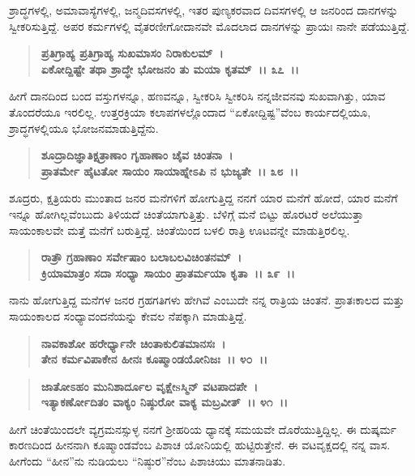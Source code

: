 ಶ್ರಾದ್ಧಗಳಲ್ಲಿ, ಅಮಾವಾಸ್ಯೆಗಳಲ್ಲಿ, ಜನ್ಮದಿವಸಗಳಲ್ಲಿ, ಇತರ ಪುಣ್ಯಕರವಾದ ದಿವಸಗಳಲ್ಲಿ ಆ ಜನರಿಂದ ದಾನಗಳನ್ನು ಸ್ವೀಕರಿಸುತ್ತಿದ್ದೆ. ಅಪರ ಕರ್ಮಗಳಲ್ಲಿ ವೈತರಣೀಗೋದಾನವೇ ಮೊದಲಾದ ದಾನಗಳನ್ನು ಪ್ರಾಯಃ ನಾನೇ ಪಡೆಯುತ್ತಿದ್ದೆ.

\begin{verse}
\textbf{ಪ್ರತಿಗ್ರಾಹ್ಯ ಪ್ರತಿಗ್ರಾಹ್ಯ ಸುಖಮಾಸಂ ನಿರಾಕುಲಮ್~।}\\\textbf{ಏಕೋದ್ದಿಷ್ಟೇ ತಥಾ ಶ್ರಾದ್ಧೇ ಭೋಜನಂ ತು ಮಯಾ ಕೃತಮ್~।। ೩೭~।।}
\end{verse}

ಹೀಗೆ ದಾನದಿಂದ ಬಂದ ವಸ್ತುಗಳನ್ನೂ, ಹಣವನ್ನೂ, ಸ್ವೀಕರಿಸಿ ಸ್ವೀಕರಿಸಿ ನನ್ನ\break ಜೀವನವು ಸುಖವಾಗಿತ್ತು, ಯಾವ ತೊಂದರೆಯೂ ಇರಲಿಲ್ಲ. ಉತ್ತರಕ್ರಿಯಾ ಕಲಾಪಗಳಲ್ಲೊಂದಾದ “ಏಕೋದ್ದಿಷ್ಟ”ವೆಂಬ ಕಾರ್ಯದಲ್ಲಿಯೂ, ಶ್ರಾದ್ಧಗಳಲ್ಲಿಯೂ ಭೋಜನಮಾಡುತ್ತಿದ್ದೆನು.

\begin{verse}
\textbf{ಶೂದ್ರಾದಿಜ್ಞಾತಿಕ್ಷತ್ರಾಣಾಂ ಗೃಹಾಣಾಂ ಚೈವ ಚಿಂತನಾ~।}\\\textbf{ಪ್ರಾತರ್ಮೇ ಹೈಟತೋ ಸಾಯಂ ಸಾಯಾಹ್ನೇಽಪಿ ನ ಭುಜ್ಯತೇ~।। ೩೮~।।}
\end{verse}

ಶೂದ್ರರು, ಕ್ಷತ್ರಿಯರು ಮುಂತಾದ ಜನರ ಮನೆಗಳಿಗೆ ಹೋಗುತ್ತಿದ್ದ ನನಗೆ ಯಾರ ಮನೆಗೆ ಹೋದೆ, ಯಾರ ಮನೆಗೆ ಇನ್ನೂ ಹೋಗಿಲ್ಲವೆಂಬುದು ತಿಳಿಯದೆ ಚಿಂತೆಯಾಗುತ್ತಿತ್ತು. ಬೆಳಿಗ್ಗೆ ಮನೆ ಬಿಟ್ಟು ಹೊರಟರೆ ಅಲೆಯುತ್ತಾ ಸಾಯಂಕಾಲವೇ ಮತ್ತೆ ಮನೆಗೆ ಬರುತ್ತಿದ್ದೆ. ಚಿಂತೆಯಿಂದ ಬಳಲಿ ರಾತ್ರಿ ಊಟವನ್ನೇ ಮಾಡುತ್ತಿರಲಿಲ್ಲ.

\begin{verse}
\textbf{ರಾತ್ರೌ ಗ್ರಹಾಣಾಂ ಸರ್ವೇಷಾಂ ಬಲಾಬಲವಿಚಿಂತನಮ್~।}\\\textbf{ಕ್ರಿಯಾಮಾತ್ರಂ ಸದಾ ಸಂಧ್ಯಾ ಸಾಯಂ ಪ್ರಾತರ್ಮಯಾ ಕೃತಾ~।। ೩೯~।।}
\end{verse}

ನಾನು ಹೋಗುತ್ತಿದ್ದ ಮನೆಗಳ ಜನರ ಗ್ರಹಗತಿಗಳು ಹೇಗಿವೆ ಎಂಬುದೇ ನನ್ನ ರಾತ್ರಿಯ ಚಿಂತನೆ. ಪ್ರಾತಃಕಾಲದ ಮತ್ತು ಸಾಯಂಕಾಲದ ಸಂಧ್ಯಾವಂದನೆಯನ್ನು ಕೇವಲ ನೆಪಕ್ಕಾಗಿ ಮಾಡುತ್ತಿದ್ದೆ.

\begin{verse}
\textbf{ನಾವಕಾಶೋ ಹರೇರ್ಧ್ಯಾನೇ ಚಿಂತಾಕುಲಿತಮಾನಸಃ~।}\\\textbf{ತೇನ ಕರ್ಮವಿಪಾಕೇನ ಹೀನಃ ಕೂಷ್ಮಾಂಡಯೋನಿಜಃ~।। ೪೦~।। }
\end{verse}

\begin{verse}
\textbf{ಜಾತೋಽಹಂ ಮುನಿಶಾರ್ದೂಲ ವೃಕ್ಷೇsಸ್ಮಿನ್ ವಟಪಾದಪೇ~।}\\\textbf{ಇತ್ಯಾಕರ್ಣೋದಿತಂ ವಾಕ್ಯಂ ನಿಷ್ಠುರೋ ವಾಕ್ಯ ಮಬ್ರವೀತ್~।। ೪೧~।।}
\end{verse}

ಹೀಗೆ ಚಿಂತೆಯಿಂದಲೇ ವ್ಯಗ್ರಮನಸ್ಸುಳ್ಳ ನನಗೆ ಶ‍್ರೀಹರಿಯ ಧ್ಯಾನಕ್ಕೆ ಸಮಯವೇ ದೊರೆಯುತ್ತಿದ್ದಿಲ್ಲ. ಈ ದುಷ್ಕರ್ಮ ಕಾರಣದಿಂದ ಹೀನನಾಗಿ ಕೂಷ್ಮಾಂಡವೆಂಬ ಪಿಶಾಚ ಯೋನಿಯಲ್ಲಿ ಹುಟ್ಟಿರುತ್ತೇನೆ. ಈ ವಟವೃಕ್ಷದಲ್ಲಿ ನನ್ನ ವಾಸ. ಹೀಗೆಂದು “ಹೀನ”ನು ನುಡಿಯಲು “ನಿಷ್ಠುರ”ನೆಂಬ ಪಿಶಾಚಿಯು ಮಾತನಾಡಿತು.

